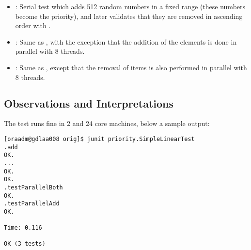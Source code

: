\begin{itemize}
  \item {}: Serial test which adds 512 random numbers in a
    fixed range (these numbers become the priority), and later validates
    that they are removed in ascending order with . \\
  \item {}: Same as , with the exception
    that the addition of the elements is done in parallel with 8
    threads. \\
  \item {}: Same as , except that
    the removal of items is also performed in parallel with 8 threads.
\end{itemize}

\subsection{Observations and Interpretations}
The test runs fine in 2 and 24 core machines, below a sample output:
\\

\begin{verbatim}
[oraadm@gdlaa008 orig]$ junit priority.SimpleLinearTest
.add
OK.
...
OK.
OK.
.testParallelBoth
OK.
.testParallelAdd
OK.

Time: 0.116

OK (3 tests)
\end{verbatim}
\hfill
